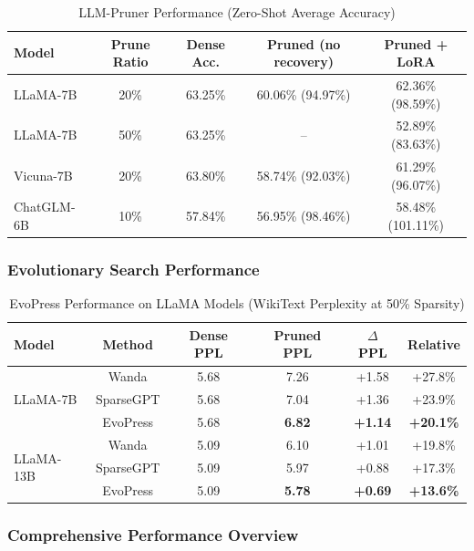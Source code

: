 \begin{table}[H]
	\centering
	\caption{LLM-Pruner Performance (Zero-Shot Average Accuracy)}
	\label{tab:llmpruner_results}
	\begin{tabular}{@{}lcccc@{}}
		\toprule
		\textbf{Model} & \textbf{Prune Ratio} & \textbf{Dense Acc.} & \textbf{Pruned (no recovery)} & \textbf{Pruned + LoRA} \\ \midrule
		LLaMA-7B & 20\% & 63.25\% & 60.06\% (94.97\%) & 62.36\% (98.59\%) \\
		LLaMA-7B & 50\% & 63.25\% & -- & 52.89\% (83.63\%) \\
		\midrule
		Vicuna-7B & 20\% & 63.80\% & 58.74\% (92.03\%) & 61.29\% (96.07\%) \\
		ChatGLM-6B & 10\% & 57.84\% & 56.95\% (98.46\%) & 58.48\% (101.11\%) \\
		\bottomrule
	\end{tabular}
\end{table}

\subsubsection{Evolutionary Search Performance}

\begin{table}[H]
	\centering
	\caption{EvoPress Performance on LLaMA Models (WikiText Perplexity at 50\% Sparsity)}
	\label{tab:evopress_results}
	\begin{tabular}{@{}lccccc@{}}
		\toprule
		\textbf{Model} & \textbf{Method} & \textbf{Dense PPL} & \textbf{Pruned PPL} & \textbf{$\Delta$ PPL} & \textbf{Relative} \\ \midrule
		\multirow{3}{*}{LLaMA-7B} & Wanda & 5.68 & 7.26 & +1.58 & +27.8\% \\
		& SparseGPT & 5.68 & 7.04 & +1.36 & +23.9\% \\
		& EvoPress & 5.68 & \textbf{6.82} & \textbf{+1.14} & \textbf{+20.1\%} \\
		\midrule
		\multirow{3}{*}{LLaMA-13B} & Wanda & 5.09 & 6.10 & +1.01 & +19.8\% \\
		& SparseGPT & 5.09 & 5.97 & +0.88 & +17.3\% \\
		& EvoPress & 5.09 & \textbf{5.78} & \textbf{+0.69} & \textbf{+13.6\%} \\
		\bottomrule
	\end{tabular}
\end{table}

\subsubsection{Comprehensive Performance Overview}

